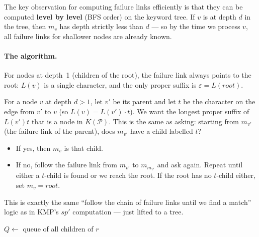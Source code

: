 
The key observation for computing failure links efficiently is that
they can be computed \textbf{level by level} (BFS order) on the keyword
tree.
If $v$ is at depth $d$ in the tree, then $m_v$ has depth strictly less
than $d$ --- so by the time we process $v$, all failure links for
shallower nodes are already known.

\paragraph{The algorithm.}
For nodes at depth~1 (children of the root), the failure link always
points to the root: $L(v)$ is a single character, and the only proper
suffix is $\varepsilon = L(root)$.

For a node $v$ at depth $d > 1$, let $v'$ be its parent and let
$t$ be the character on the edge from $v'$ to $v$ (so
$L(v) = L(v') \cdot t$).
We want the longest proper suffix of $L(v')t$ that is a node in
$K(\mathcal{P})$.
This is the same as asking: starting from $m_{v'}$ (the failure link
of the parent), does $m_{v'}$ have a child labelled $t$?
\begin{itemize}[nosep]
  \item If yes, then $m_v$ is that child.
  \item If no, follow the failure link from $m_{v'}$ to $m_{m_{v'}}$
        and ask again.
        Repeat until either a $t$-child is found or we reach the root.
        If the root has no $t$-child either, set $m_v = root$.
\end{itemize}

This is exactly the same ``follow the chain of failure links until we
find a match'' logic as in KMP's $sp'$ computation --- just lifted to
a tree.

\begin{algorithm}[H]
  \caption{Compute failure links for $K(\mathcal{P})$ (BFS)}
  \label{alg:ac-failure}
  $Q \gets$ queue of all children of $r$\;
\end{algorithm}

